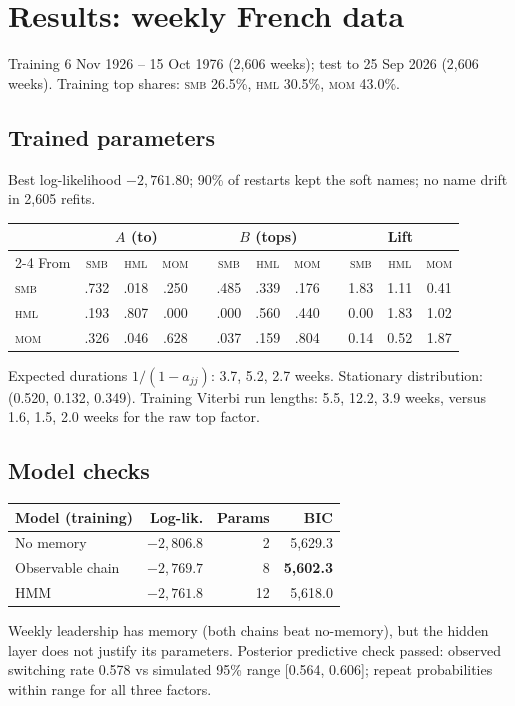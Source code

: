 \documentclass[11pt]{article}
\newcommand{\SMB}{\textsc{smb}}
\newcommand{\HML}{\textsc{hml}}
\newcommand{\MOM}{\textsc{mom}}
\begin{document}
\section{Results: weekly French data}\label{sec:weekly}

Training 6 Nov 1926 -- 15 Oct 1976 (2{,}606 weeks); test to 25 Sep 2026 (2{,}606 weeks). Training top shares: \SMB{} 26.5\%, \HML{} 30.5\%, \MOM{} 43.0\%.

\subsection{Trained parameters}
Best log-likelihood $-2{,}761.80$; 90\% of restarts kept the soft names; no name drift in 2{,}605 refits.
\begin{center}
\begin{tabular}{l ccc c ccc c ccc}
\toprule
 & \multicolumn{3}{c}{$A$ (to)} && \multicolumn{3}{c}{$B$ (tops)} && \multicolumn{3}{c}{Lift} \\
\cmidrule{2-4}\cmidrule{6-8}\cmidrule{10-12}
From & \SMB & \HML & \MOM && \SMB & \HML & \MOM && \SMB & \HML & \MOM \\
\midrule
\SMB & .732 & .018 & .250 && .485 & .339 & .176 && 1.83 & 1.11 & 0.41 \\
\HML & .193 & .807 & .000 && .000 & .560 & .440 && 0.00 & 1.83 & 1.02 \\
\MOM & .326 & .046 & .628 && .037 & .159 & .804 && 0.14 & 0.52 & 1.87 \\
\bottomrule
\end{tabular}
\end{center}
Expected durations $1/(1-a_{jj})$: 3.7, 5.2, 2.7 weeks. Stationary distribution: (0.520, 0.132, 0.349). Training Viterbi run lengths: 5.5, 12.2, 3.9 weeks, versus 1.6, 1.5, 2.0 weeks for the raw top factor.

\subsection{Model checks}
\begin{center}
\begin{tabular}{lrrr}
\toprule
Model (training) & Log-lik. & Params & BIC \\
\midrule
No memory & $-2{,}806.8$ & 2 & 5{,}629.3 \\
Observable chain & $-2{,}769.7$ & 8 & \textbf{5{,}602.3} \\
HMM & $-2{,}761.8$ & 12 & 5{,}618.0 \\
\bottomrule
\end{tabular}
\end{center}
Weekly leadership has memory (both chains beat no-memory), but the hidden layer does not justify its parameters. Posterior predictive check passed: observed switching rate 0.578 vs simulated 95\% range [0.564, 0.606]; repeat probabilities within range for all three factors.
\end{document}
